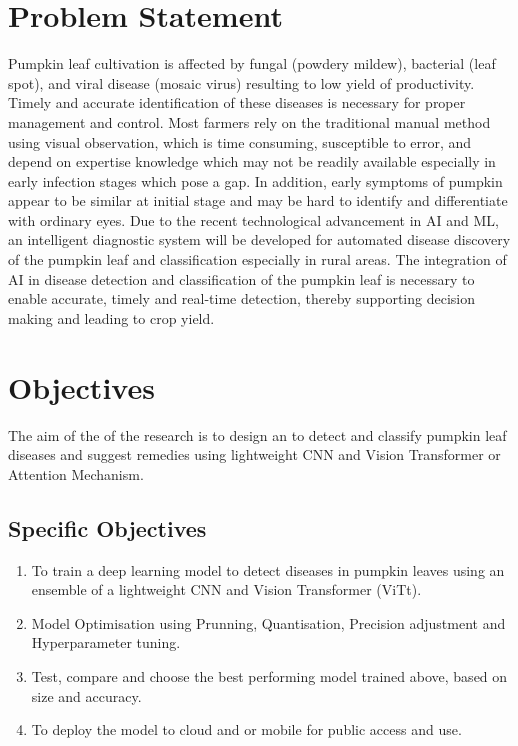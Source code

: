 {\section{Problem Statement}
Pumpkin leaf cultivation is affected by fungal (powdery mildew),
	bacterial (leaf spot), and viral disease (mosaic virus) resulting
	to low yield of productivity. Timely and accurate identification of
	these diseases is necessary for proper management and control. Most
	farmers rely on the traditional manual method using visual observation,
	which is time consuming, susceptible to error, and depend on expertise
	knowledge which may not be readily available especially in early infection
	stages which pose a gap. In addition, early symptoms of pumpkin appear
	to be similar at initial stage and may be hard to identify and differentiate
	with ordinary eyes. Due to the recent technological advancement in
	AI and ML, an intelligent diagnostic system will be developed for
	automated disease discovery of the pumpkin leaf and classification
	especially in rural areas. The integration of AI in disease detection
	and classification of the pumpkin leaf is necessary to enable accurate,
	timely and real-time detection, thereby supporting decision making
	and leading to crop yield.

\section{Objectives}
The aim of the of the research is to design an \topic %
to detect and classify pumpkin leaf diseases and suggest remedies using lightweight CNN and Vision Transformer or Attention Mechanism.

\subsection*{Specific Objectives}
\begin{enumerate}
	\item To train a deep learning model to detect diseases in pumpkin leaves using an ensemble of a lightweight CNN and Vision Transformer (ViTt).
	\item Model Optimisation using Prunning, Quantisation, Precision adjustment and Hyperparameter tuning.
	
	\item Test, compare and choose the best performing model trained above, based on size and accuracy.
	\item To deploy the model to cloud and or mobile for public access and use.
	

\end{enumerate}}
